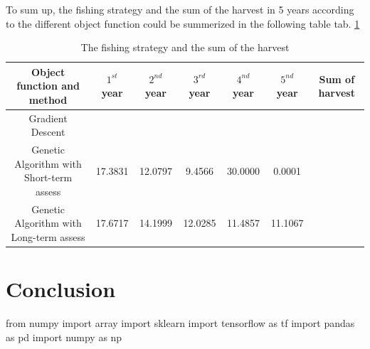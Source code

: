 \documentclass{IEEEtran}
\begin{document}
To sum up, the fishing strategy and the sum of the harvest in 5 years according to the different object function could be summerized in the following table tab. \ref{tab1}

\begin{table}[!t]
    \normalsize
    \caption{The fishing strategy and the sum of the harvest}
    \label{tab1}
    \begin{tabular}{|c|c|c|c|c|c|c|}\hline
        Object function and method & $1^{st}$ year & $2^{nd}$ year & $3^{rd}$ year & $4^{nd}$ year & $5^{nd}$ year & Sum of harvest \\ 
        \hline
        Gradient Descent & & & & & &\\ \hline
        Genetic Algorithm with Short-term assess & 17.3831 & 12.0797 & 9.4566 & 30.0000 & 0.0001 & \\ \hline
        Genetic Algorithm with Long-term assess & 17.6717 & 14.1999 & 12.0285 & 11.4857 & 11.1067 & \\ \hline
    \end{tabular}
\vspace*{4pt} 
\end{table}


\section{Conclusion}
from numpy import array 
import sklearn
import tensorflow as tf
import pandas as pd
import numpy as np
\end{document}
